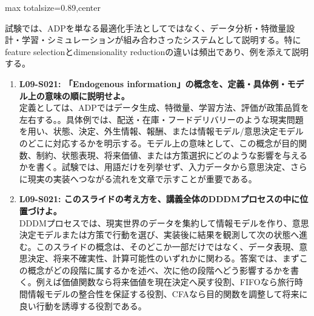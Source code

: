 \begin{minipage}[t]{0.58\textwidth}
\begin{adjustbox}{max totalsize={\textwidth}{0.89\textheight},center}
\begin{minipage}{\textwidth}
試験では、ADPを単なる最適化手法としてではなく、データ分析・特徴量設計・学習・シミュレーションが組み合わさったシステムとして説明する。特にfeature selectionとdimensionality reductionの違いは頻出であり、例を添えて説明する。\par{}\begin{enumerate}\item \textbf{L09-S021: 「Endogenous information」の概念を、定義・具体例・モデル上の意味の順に説明せよ。}\\定義としては、ADPではデータ生成、特徴量、学習方法、評価が政策品質を左右する。。具体例では、配送・在庫・フードデリバリーのような現実問題を用い、状態、決定、外生情報、報酬、または情報モデル/意思決定モデルのどこに対応するかを明示する。モデル上の意味として、この概念が目的関数、制約、状態表現、将来価値、または方策選択にどのような影響を与えるかを書く。試験では、用語だけを列挙せず、入力データから意思決定、さらに現実の実装へつながる流れを文章で示すことが重要である。\item \textbf{L09-S021: このスライドの考え方を、講義全体のDDDMプロセスの中に位置づけよ。}\\DDDMプロセスでは、現実世界のデータを集約して情報モデルを作り、意思決定モデルまたは方策で行動を選び、実装後に結果を観測して次の状態へ進む。このスライドの概念は、そのどこか一部だけではなく、データ表現、意思決定、将来不確実性、計算可能性のいずれかに関わる。答案では、まずこの概念がどの段階に属するかを述べ、次に他の段階へどう影響するかを書く。例えば価値関数なら将来価値を現在決定へ戻す役割、FIFOなら旅行時間情報モデルの整合性を保証する役割、CFAなら目的関数を調整して将来に良い行動を誘導する役割である。\end{enumerate}
\end{minipage}
\end{adjustbox}
\end{minipage}


